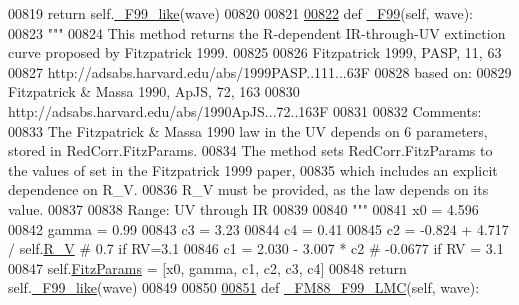\begin{DoxyCode}
{00819         \textcolor{keywordflow}{return} self.\hyperlink{classpyneb_1_1extinction_1_1red__corr_1_1_red_corr_afa769aa42ed7d39fb04fd36fda88b54e}{\_F99\_like}(wave)
00820 
00821 
\hypertarget{red__corr_8py_source_l00822}{}\hyperlink{classpyneb_1_1extinction_1_1red__corr_1_1_red_corr_a05f6dd65005f473d38e0c1014c58fb61}{00822}     \textcolor{keyword}{def }\hyperlink{classpyneb_1_1extinction_1_1red__corr_1_1_red_corr_a05f6dd65005f473d38e0c1014c58fb61}{\_F99}(self, wave):
00823         \textcolor{stringliteral}{"""}
00824 \textcolor{stringliteral}{        This method returns the R-dependent IR-through-UV extinction curve proposed by Fitzpatrick 1999.}
00825 \textcolor{stringliteral}{}
00826 \textcolor{stringliteral}{        Fitzpatrick 1999, PASP, 11, 63}
00827 \textcolor{stringliteral}{        http://adsabs.harvard.edu/abs/1999PASP..111...63F}
00828 \textcolor{stringliteral}{        based on: }
00829 \textcolor{stringliteral}{        Fitzpatrick & Massa 1990, ApJS, 72, 163}
00830 \textcolor{stringliteral}{        http://adsabs.harvard.edu/abs/1990ApJS...72..163F}
00831 \textcolor{stringliteral}{        }
00832 \textcolor{stringliteral}{        Comments:}
00833 \textcolor{stringliteral}{        The Fitzpatrick & Massa 1990 law in the UV depends on 6 parameters, stored in RedCorr.FitzParams.}
00834 \textcolor{stringliteral}{        The method sets RedCorr.FitzParams to the values of set in the Fitzpatrick 1999 paper, }
00835 \textcolor{stringliteral}{        which includes an explicit dependence on R\_V.}
00836 \textcolor{stringliteral}{        R\_V must be provided, as the law depends on its value.}
00837 \textcolor{stringliteral}{        }
00838 \textcolor{stringliteral}{        Range: UV through IR}
00839 \textcolor{stringliteral}{}
00840 \textcolor{stringliteral}{        """}
00841         x0 = 4.596  
00842         gamma = 0.99    
00843         c3 = 3.23    
00844         c4 = 0.41    
00845         c2 = -0.824 + 4.717 / self.\hyperlink{classpyneb_1_1extinction_1_1red__corr_1_1_red_corr_a4696ecdd84c912c20e6aa19b1573e875}{R\_V} \textcolor{comment}{# 0.7 if RV=3.1}
00846         c1 = 2.030 - 3.007 * c2 \textcolor{comment}{# -0.0677 if RV = 3.1}
00847         self.\hyperlink{classpyneb_1_1extinction_1_1red__corr_1_1_red_corr_a133fcc7513d358e629266b24cbe7bebc}{FitzParams} = [x0, gamma, c1, c2, c3, c4]
00848         \textcolor{keywordflow}{return} self.\hyperlink{classpyneb_1_1extinction_1_1red__corr_1_1_red_corr_afa769aa42ed7d39fb04fd36fda88b54e}{\_F99\_like}(wave)
00849 
00850 
\hypertarget{red__corr_8py_source_l00851}{}\hyperlink{classpyneb_1_1extinction_1_1red__corr_1_1_red_corr_aa175c2a1489246b81d7c3b81fb88d7d9}{00851}     \textcolor{keyword}{def }\hyperlink{classpyneb_1_1extinction_1_1red__corr_1_1_red_corr_aa175c2a1489246b81d7c3b81fb88d7d9}{\_FM88\_F99\_LMC}(self, wave):
}
\end{DoxyCode}
